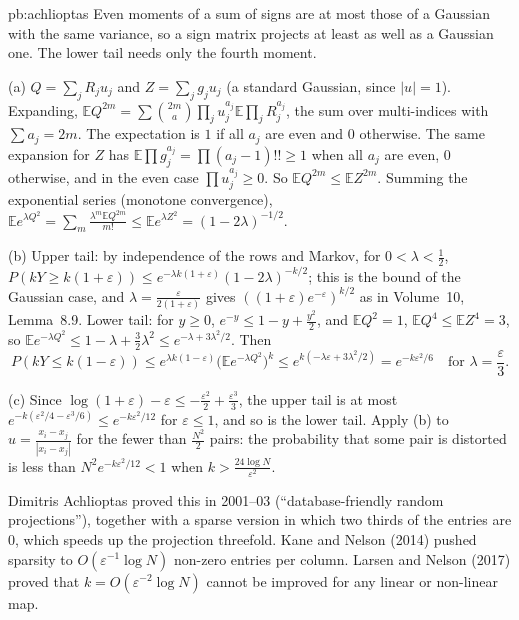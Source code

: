 \begin{solution}{pb:achlioptas}
\idea Even moments of a sum of signs are at most those of a Gaussian with the same variance, so a sign matrix projects at least as well as a Gaussian one. The lower tail
needs only the fourth moment.

\writeup (a) $Q=\sum_jR_ju_j$ and $Z=\sum_jg_ju_j$ (a standard Gaussian, since $|u|=1$). Expanding, $\mathbb EQ^{2m}=\sum\binom{2m}{a}\prod_ju_j^{a_j}\mathbb E\prod_jR_j^{a_j}$, the
sum over multi-indices with $\sum a_j=2m$. The expectation is $1$ if all $a_j$ are even and $0$ otherwise. The same expansion for $Z$ has $\mathbb E\prod g_j^{a_j}=\prod(a_j-1)!!\ge1$
when all $a_j$ are even, $0$ otherwise, and in the even case $\prod u_j^{a_j}\ge0$. So $\mathbb EQ^{2m}\le\mathbb EZ^{2m}$. Summing the exponential series (monotone convergence),
$\mathbb Ee^{\lambda Q^2}=\sum_m\frac{\lambda^m\mathbb EQ^{2m}}{m!}\le\mathbb Ee^{\lambda Z^2}=(1-2\lambda)^{-1/2}$.

(b) Upper tail: by independence of the rows and Markov, for $0<\lambda<\frac12$, $P(kY\ge k(1+\varepsilon))\le e^{-\lambda k(1+\varepsilon)}(1-2\lambda)^{-k/2}$; this is the bound of
the Gaussian case, and $\lambda=\frac\varepsilon{2(1+\varepsilon)}$ gives $((1+\varepsilon)e^{-\varepsilon})^{k/2}$ as in Volume~10, Lemma~8.9. Lower tail: for $y\ge0$, $e^{-y}\le1-y+\frac{y^2}2$,
and $\mathbb EQ^2=1$, $\mathbb EQ^4\le\mathbb EZ^4=3$, so $\mathbb Ee^{-\lambda Q^2}\le1-\lambda+\frac32\lambda^2\le e^{-\lambda+3\lambda^2/2}$. Then
\[
P(kY\le k(1-\varepsilon))\le e^{\lambda k(1-\varepsilon)}\bigl(\mathbb Ee^{-\lambda Q^2}\bigr)^k\le e^{k(-\lambda\varepsilon+3\lambda^2/2)}=e^{-k\varepsilon^2/6}\quad\text{for }\lambda=\frac\varepsilon3.
\]

(c) Since $\log(1+\varepsilon)-\varepsilon\le-\frac{\varepsilon^2}2+\frac{\varepsilon^3}3$, the upper tail is at most $e^{-k(\varepsilon^2/4-\varepsilon^3/6)}\le e^{-k\varepsilon^2/12}$ for $\varepsilon\le1$, and so is
the lower tail. Apply (b) to $u=\frac{x_i-x_j}{|x_i-x_j|}$ for the fewer than $\frac{N^2}2$ pairs: the probability that some pair is distorted is less than
$N^2e^{-k\varepsilon^2/12}<1$ when $k>\frac{24\log N}{\varepsilon^2}$.

\leads Dimitris Achlioptas proved this in 2001--03 (``database-friendly random projections''), together with a sparse version in which two thirds of the entries are $0$, which
speeds up the projection threefold. Kane and Nelson (2014) pushed sparsity to $O(\varepsilon^{-1}\log N)$ non-zero entries per column. Larsen and Nelson (2017) proved that
$k=O(\varepsilon^{-2}\log N)$ cannot be improved for any linear or non-linear map.
\end{solution}

